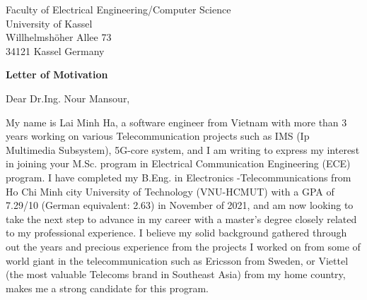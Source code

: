 \documentclass[a4paper,12pt]{letter}
\date{}
\begin{document}
\begin{letter}{
    Faculty of Electrical Engineering/Computer Science
    \\ University of Kassel
    \\ Willhelmshöher Allee 73
    \\ 34121 Kassel Germany
}

\vspace*{-1.5cm}
\begin{center}
    \LARGE \textbf{Letter of Motivation}
\end{center}

\vspace{0.2cm} %

\opening{Dear Dr.Ing. Nour Mansour,}

My name is Lai Minh Ha, a software engineer from Vietnam with more than 3 years working on various Telecommunication projects such as IMS (Ip Multimedia Subsystem), 5G-core system, and I am writing to express my interest in joining your M.Sc. program in Electrical Communication Engineering (ECE) program. I have completed my B.Eng. in Electronics -Telecommunications from Ho Chi Minh city University of Technology (VNU-HCMUT) with a GPA of 7.29/10 (German equivalent: 2.63) in November of 2021, and am now looking to take the next step to advance in my career with a master's degree closely related to my professional experience. I believe my solid background gathered through out the years and precious experience from the projects I worked on from some of world giant in the telecommunication such as Ericsson from Sweden, or Viettel (the most valuable Telecoms brand in Southeast Asia) from my home country, makes me a strong candidate for this program. 

% 


\end{letter}
\end{document}

